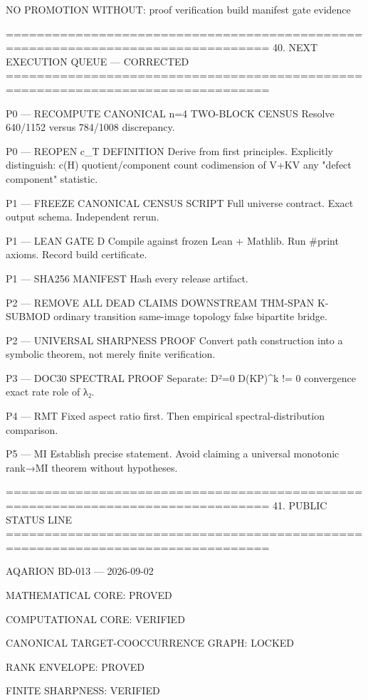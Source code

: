 NO PROMOTION WITHOUT:
  proof
  verification
  build
  manifest
  gate evidence

================================================================================
40. NEXT EXECUTION QUEUE — CORRECTED
================================================================================

P0 — RECOMPUTE CANONICAL n=4 TWO-BLOCK CENSUS
     Resolve 640/1152 versus 784/1008 discrepancy.

P0 — REOPEN c_T DEFINITION
     Derive from first principles.
     Explicitly distinguish:
       c(H)
       quotient/component count
       codimension of V+KV
       any "defect component" statistic.

P1 — FREEZE CANONICAL CENSUS SCRIPT
     Full universe contract.
     Exact output schema.
     Independent rerun.

P1 — LEAN GATE D
     Compile against frozen Lean + Mathlib.
     Run #print axioms.
     Record build certificate.

P1 — SHA256 MANIFEST
     Hash every release artifact.

P2 — REMOVE ALL DEAD CLAIMS DOWNSTREAM
     THM-SPAN
     K-SUBMOD
     ordinary transition
     same-image topology
     false bipartite bridge.

P2 — UNIVERSAL SHARPNESS PROOF
     Convert path construction into a symbolic theorem,
     not merely finite verification.

P3 — DOC30 SPECTRAL PROOF
     Separate:
       D²=0
       D(KP)^k != 0
       convergence
       exact rate
       role of λ₂.

P4 — RMT
     Fixed aspect ratio first.
     Then empirical spectral-distribution comparison.

P5 — MI
     Establish precise statement.
     Avoid claiming a universal monotonic rank→MI theorem
     without hypotheses.

================================================================================
41. PUBLIC STATUS LINE
================================================================================

AQARION BD-013 — 2026-09-02

MATHEMATICAL CORE:
PROVED

COMPUTATIONAL CORE:
VERIFIED

CANONICAL TARGET-COOCCURRENCE GRAPH:
LOCKED

RANK ENVELOPE:
PROVED

FINITE SHARPNESS:
VERIFIED

